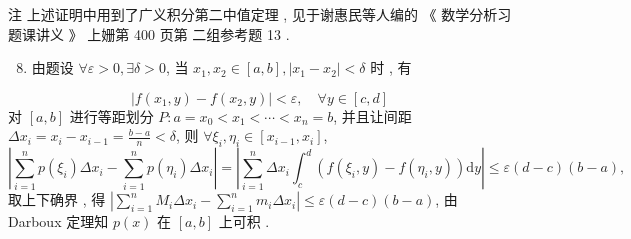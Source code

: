 \documentclass[10pt]{article}
\begin{document}
 注   上述证明中用到了广义积分第二中值定理 ,  见于谢惠民等人编的 《 数学分析习题课讲义 》 上姗第  400  页第   二组参考题  13 .

\begin{enumerate}
  \setcounter{enumi}{7}
  \item  由题设  $\forall \varepsilon>0, \exists \delta>0$,  当  $x_{1}, x_{2} \in[a, b],\left|x_{1}-x_{2}\right|<\delta$  时 ,  有 
\end{enumerate}
$$
\left|f\left(x_{1}, y\right)-f\left(x_{2}, y\right)\right|<\varepsilon, \quad \forall y \in[c, d]
$$
 对  $[a, b]$  进行等距划分  $P: a=x_{0}<x_{1}<\cdots<x_{n}=b$,  并且让间距  $\Delta x_{i}=x_{i}-x_{i-1}=\frac{b-a}{n}<\delta$,  则  $\forall \xi_{i}, \eta_{i} \in\left[x_{i-1}, x_{i}\right]$,
$$
\left|\sum_{i=1}^{n} p\left(\xi_{i}\right) \Delta x_{i}-\sum_{i=1}^{n} p\left(\eta_{i}\right) \Delta x_{i}\right|=\left|\sum_{i=1}^{n} \Delta x_{i} \int_{c}^{d}\left(f\left(\xi_{i}, y\right)-f\left(\eta_{i}, y\right)\right) \mathrm{d} y\right| \leqslant \varepsilon(d-c)(b-a),
$$
 取上下确界 ,  得  $\left|\sum_{i=1}^{n} M_{i} \Delta x_{i}-\sum_{i=1}^{n} m_{i} \Delta x_{i}\right| \leqslant \varepsilon(d-c)(b-a)$,  由  Darboux  定理知  $p(x)$  在  $[a, b]$  上可积 .
\end{document}
